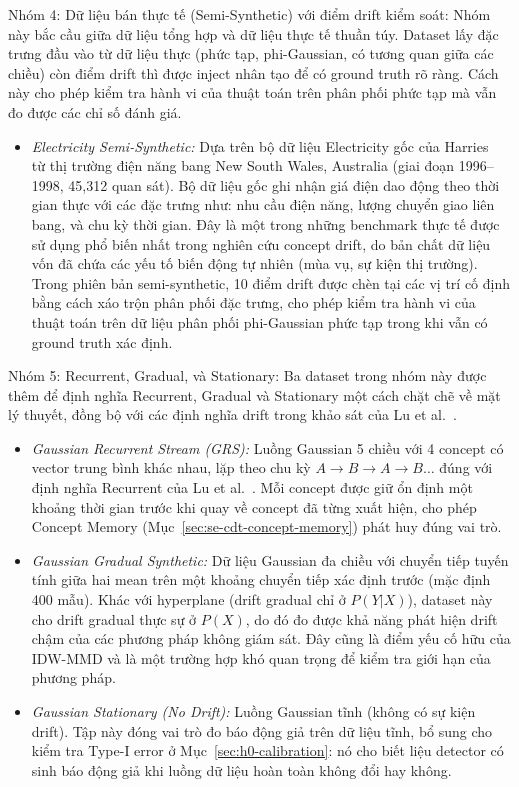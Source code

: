 Nhóm 4: Dữ liệu bán thực tế (Semi-Synthetic) với điểm drift kiểm soát: Nhóm này bắc cầu giữa dữ liệu tổng hợp và dữ liệu thực tế thuần túy. Dataset lấy đặc trưng đầu vào từ dữ liệu thực (phức tạp, phi-Gaussian, có tương quan giữa các chiều) còn điểm drift thì được inject nhân tạo để có ground truth rõ ràng. Cách này cho phép kiểm tra hành vi của thuật toán trên phân phối phức tạp mà vẫn đo được các chỉ số đánh giá.
\begin{itemize}
	\item \textit{Electricity Semi-Synthetic:} Dựa trên bộ dữ liệu Electricity gốc của Harries~\cite{harries1999splice} từ thị trường điện năng bang New South Wales, Australia (giai đoạn 1996--1998, 45,312 quan sát). Bộ dữ liệu gốc ghi nhận giá điện dao động theo thời gian thực với các đặc trưng như: nhu cầu điện năng, lượng chuyển giao liên bang, và chu kỳ thời gian. Đây là một trong những benchmark thực tế được sử dụng phổ biến nhất trong nghiên cứu concept drift, do bản chất dữ liệu vốn đã chứa các yếu tố biến động tự nhiên (mùa vụ, sự kiện thị trường). Trong phiên bản semi-synthetic, 10 điểm drift được chèn tại các vị trí cố định bằng cách xáo trộn phân phối đặc trưng, cho phép kiểm tra hành vi của thuật toán trên dữ liệu phân phối phi-Gaussian phức tạp trong khi vẫn có ground truth xác định.
\end{itemize}

Nhóm 5: Recurrent, Gradual, và Stationary: Ba dataset trong nhóm này được thêm để định nghĩa Recurrent, Gradual và Stationary một cách chặt chẽ về mặt lý thuyết, đồng bộ với các định nghĩa drift trong khảo sát của Lu et al.~\cite{lu2018learning}.
\begin{itemize}
	\item \textit{Gaussian Recurrent Stream (GRS):} Luồng Gaussian 5 chiều với 4 concept có vector trung bình khác nhau, lặp theo chu kỳ $A\to B\to A\to B\dots$ đúng với định nghĩa Recurrent của Lu et al.~\cite{lu2018learning}. Mỗi concept được giữ ổn định một khoảng thời gian trước khi quay về concept đã từng xuất hiện, cho phép Concept Memory (Mục~\ref{sec:se-cdt-concept-memory}) phát huy đúng vai trò.
	\item \textit{Gaussian Gradual Synthetic:} Dữ liệu Gaussian đa chiều với chuyển tiếp tuyến tính giữa hai mean trên một khoảng chuyển tiếp xác định trước (mặc định 400 mẫu). Khác với hyperplane (drift gradual chỉ ở $P(Y|X)$), dataset này cho drift gradual thực sự ở $P(X)$, do đó đo được khả năng phát hiện drift chậm của các phương pháp không giám sát. Đây cũng là điểm yếu cố hữu của IDW-MMD và là một trường hợp khó quan trọng để kiểm tra giới hạn của phương pháp.
	\item \textit{Gaussian Stationary (No Drift):} Luồng Gaussian tĩnh (không có sự kiện drift). Tập này đóng vai trò đo báo động giả trên dữ liệu tĩnh, bổ sung cho kiểm tra Type-I error ở Mục~\ref{sec:h0-calibration}: nó cho biết liệu detector có sinh báo động giả khi luồng dữ liệu hoàn toàn không đổi hay không.
\end{itemize}



